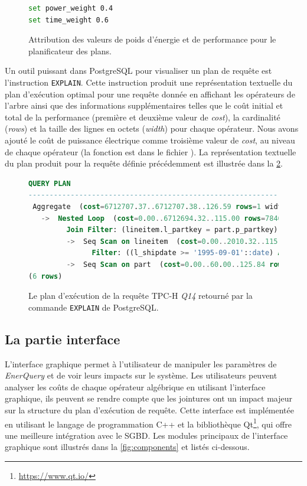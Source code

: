 \begin{figure}
\begin{lstlisting}[language=Bash]
set power_weight 0.4
set time_weight 0.6
\end{lstlisting}
  \caption{Attribution des valeurs de poids d'énergie et de performance pour le planificateur des plans.}\label{fig:postgresql.conf}
\end{figure}

Un outil puissant dans PostgreSQL pour visualiser un plan de requête est l'instruction \texttt{EXPLAIN}. Cette instruction produit une représentation textuelle du plan d'exécution optimal pour une requête donnée en affichant les opérateurs de l'arbre ainsi que des informations supplémentaires telles que le coût initial et total de la performance (première et deuxième valeur de \textit{cost}), la cardinalité (\textit{rows}) et la taille des lignes en octets (\textit{width}) pour chaque opérateur. Nous avons ajouté le coût de puissance électrique comme troisième valeur de \textit{cost}, au niveau de chaque opérateur (la fonction est dans le fichier ). La représentation textuelle du plan produit pour la requête définie précédemment est illustrée dans la \ref{fig:postgres-explain}.

\begin{figure}
\begin{lstlisting}[language=sql]
                                     QUERY PLAN                                                            
-------------------------------------------------------------------------------------------------
 Aggregate  (cost=6712707.37..6712707.38..126.59 rows=1 width=33)
   ->  Nested Loop  (cost=0.00..6712694.32..115.00 rows=78460 width=33)
         Join Filter: (lineitem.l_partkey = part.p_partkey)
         ->  Seq Scan on lineitem  (cost=0.00..2010.32..115.55 rows=78460 width=16)
               Filter: ((l_shipdate >= '1995-09-01'::date) AND (l_shipdate < '1995-10-01 00:00:00'::timestamp without time zone))
         ->  Seq Scan on part  (cost=0.00..60.00..125.84 rows=200000 width=25)
(6 rows)
\end{lstlisting}
\caption{Le plan d'exécution de la requête TPC-H \textit{Q14} retourné par la commande \texttt{EXPLAIN} de PostgreSQL.}\label{fig:postgres-explain}
\end{figure}

\subsection{La partie interface}
L'interface graphique permet à l'utilisateur de manipuler les paramètres de \textit{EnerQuery} et de voir leurs impacts sur le système. Les utilisateurs peuvent analyser les coûts de chaque opérateur algébrique en utilisant l'interface graphique, ils peuvent se rendre compte que les jointures ont un impact majeur sur la structure du plan d'exécution de requête. Cette interface est implémentée en utilisant le langage de programmation C++ et la bibliothèque Qt\footnote{\url{https://www.qt.io/}}, qui offre une meilleure intégration avec le SGBD.
Les modules principaux de l'interface graphique sont illustrés dans la \ref{fig:components} et listés ci-dessous.

